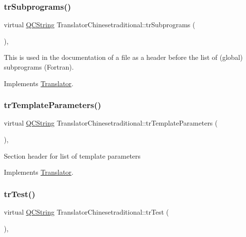 \subsubsection{\texorpdfstring{trSubprograms()}{trSubprograms()}}
{\footnotesize\ttfamily virtual \mbox{\hyperlink{class_q_c_string}{Q\+C\+String}} Translator\+Chinesetraditional\+::tr\+Subprograms (\begin{DoxyParamCaption}{ }\end{DoxyParamCaption})\hspace{0.3cm}{\ttfamily [inline]}, {\ttfamily [virtual]}}

This is used in the documentation of a file as a header before the list of (global) subprograms (Fortran). 

Implements \mbox{\hyperlink{class_translator}{Translator}}.

\mbox{\label{class_translator_chinesetraditional_a2905cc66e8c20210948c8f8511241950}} 
\subsubsection{\texorpdfstring{trTemplateParameters()}{trTemplateParameters()}}
{\footnotesize\ttfamily virtual \mbox{\hyperlink{class_q_c_string}{Q\+C\+String}} Translator\+Chinesetraditional\+::tr\+Template\+Parameters (\begin{DoxyParamCaption}{ }\end{DoxyParamCaption})\hspace{0.3cm}{\ttfamily [inline]}, {\ttfamily [virtual]}}

Section header for list of template parameters 

Implements \mbox{\hyperlink{class_translator}{Translator}}.

\mbox{\label{class_translator_chinesetraditional_a986fde8083b58bef975adf8b94e40718}} 
\subsubsection{\texorpdfstring{trTest()}{trTest()}}
{\footnotesize\ttfamily virtual \mbox{\hyperlink{class_q_c_string}{Q\+C\+String}} Translator\+Chinesetraditional\+::tr\+Test (\begin{DoxyParamCaption}{ }\end{DoxyParamCaption})\hspace{0.3cm}{\ttfamily [inline]}, {\ttfamily [virtual]}}

